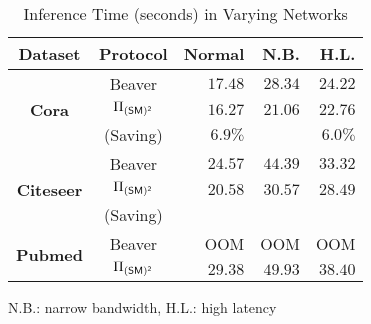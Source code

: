 \begin{table}[!t]
    \centering
        \caption{Inference Time (seconds) in Varying Networks}
        \label{table:inf_time_net}
  \setlength\tabcolsep{5pt}
            \begin{tabular}{c|c|r|r|r}
                \hline
     \textbf{Dataset} & \textbf{Protocol} & \textbf{Normal} & \textbf{N.B.} & \textbf{H.L.}\\
                \hline
    \multirow{3}{*}{\textbf{Cora}} & Beaver &$17.48$  &  $28.34$ &   $24.22$    \\
       &$\Pi_{\mathsf{(SM)^2}}$&$16.27 $  &  $ 21.06$  &  $22.76 $   \\ 
       & (Saving) &{$6.9\%$}& \cellcolor{grayL}{$25.7\%$} & {$ 6.0\%$}  \\\hline
   \multirow{3}{*}{\textbf{Citeseer}}& Beaver & $24.57 $    &$ 44.39$  &$33.32$    \\
     &$\Pi_{\mathsf{(SM)^2}}$&$ 20.58 $    &$30.57 $    &$28.49 $     \\ 
     & (Saving) & \cellcolor{grayL}{$16.2\%$} & \cellcolor{grayL}{$31.3\%$} & \cellcolor{grayL}{$14.5\%$}   \\\hline
     \multirow{2}{*}{\textbf{Pubmed}} & Beaver & OOM  &  OOM    & OOM  \\
 & $\Pi_{\mathsf{(SM)^2}}$ &$ 29.38$     &$49.93 $  &$38.40 $  \\
    \hline
            \end{tabular}

N.B.: narrow bandwidth,
H.L.: high latency
\end{table}

